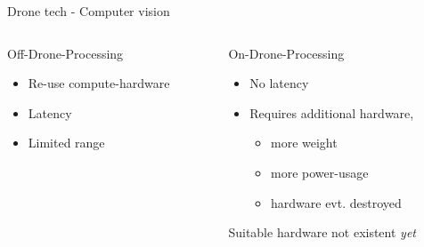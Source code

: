 \documentclass[aspectratio=169]{beamer}
\begin{document}
\begin{frame}{Drone tech - Computer vision}
	\begin{columns}
	
		\begin{column}{.49\textwidth}
			Off-Drone-Processing
			\begin{itemize}
				\item Re-use compute-hardware
				\item Latency
				\item Limited range
			\end{itemize}
		\end{column}

		\begin{column}{.49\textwidth}
			On-Drone-Processing
			\begin{itemize}
				\item No latency
				\item Requires additional hardware,
					\begin{itemize}
						\item more weight
						\item more power-usage
						\item hardware evt. destroyed
					\end{itemize}
			\end{itemize}
			Suitable hardware not existent \emph{yet}			
		\end{column}
	\end{columns}
\end{frame}
\end{document}
